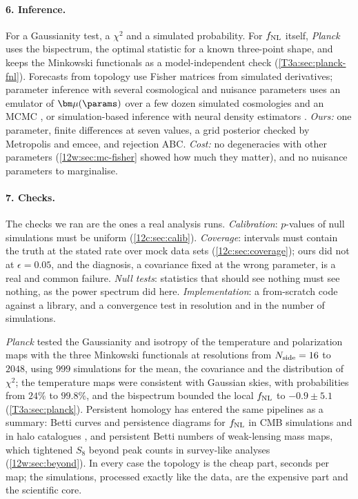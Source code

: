 \paragraph{6. Inference.} For a Gaussianity test, a $\chi^2$ and a simulated probability. For $f_{\rm NL}$ itself, \textit{Planck} uses the
bispectrum, the optimal statistic for a known three-point shape, and keeps the Minkowski functionals as a model-independent check
(\cref{T3a:sec:planck-fnl}). Forecasts from topology use Fisher matrices from simulated derivatives; parameter inference with several
cosmological and nuisance parameters uses an emulator of $\bm\mu(\params)$ over a few dozen simulated cosmologies and an MCMC
\cite{Heydenreich2021}, or simulation-based inference with neural density estimators \cite{Alsing2019}. \emph{Ours:} one parameter, finite
differences at seven values, a grid posterior checked by Metropolis and emcee, and rejection ABC. \emph{Cost:} no degeneracies with other
parameters (\cref{12w:sec:mc-fisher} showed how much they matter), and no nuisance parameters to marginalise.

\paragraph{7. Checks.} The checks we ran are the ones a real analysis runs. \emph{Calibration}: $p$-values of null simulations must
be uniform (\cref{12c:sec:calib}). \emph{Coverage}: intervals must contain the truth at the stated rate over mock data sets
(\cref{12c:sec:coverage}); ours did not at $\epsilon=0.05$, and the diagnosis, a covariance fixed at the wrong parameter, is a real and common
failure. \emph{Null tests}: statistics that should see nothing must see nothing, as the power spectrum did here. \emph{Implementation}: a
from-scratch code against a library, and a convergence test in resolution and in the number of simulations.

\begin{inpractice}
\textit{Planck} tested the Gaussianity and isotropy of the temperature and polarization maps with the three Minkowski functionals at
resolutions from $N_{\rm side}=16$ to $2048$, using $999$ simulations for the mean, the covariance and the distribution of $\chi^2$; the
temperature maps were consistent with Gaussian skies, with probabilities from $24\%$ to $99.8\%$, and the bispectrum bounded the local
$f_{\rm NL}$ to $-0.9\pm5.1$ \cite{Planck2018VII,Planck2018IX} (\cref{T3a:sec:planck}). Persistent homology has entered the same pipelines as a
summary: Betti curves and persistence diagrams for $f_{\rm NL}$ in CMB simulations \cite{ColeShiu2018} and in halo catalogues
\cite{Biagetti2021}, and persistent Betti numbers of weak-lensing mass maps, which tightened $S_8$ beyond peak counts in survey-like
analyses \cite{Heydenreich2021} (\cref{12w:sec:beyond}). In every case the topology is the cheap part, seconds per map; the simulations,
processed exactly like the data, are the expensive part and the scientific core.
\end{inpractice}

